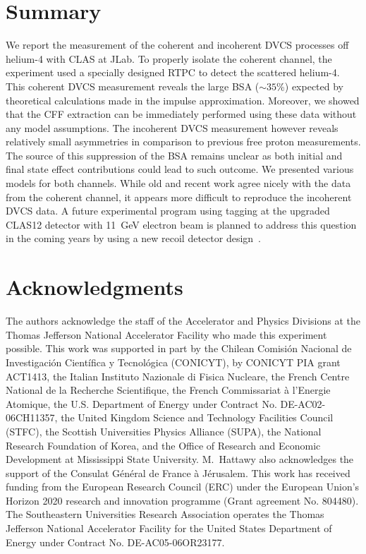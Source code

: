 \documentclass[aps,prc,preprint,superscriptaddress]{revtex4}
\begin{document}
\section{Summary}

We report the measurement of the coherent and incoherent DVCS processes off helium-4 with
CLAS at JLab. To properly isolate the coherent channel, the experiment used a specially 
designed RTPC to detect the scattered helium-4. This coherent 
DVCS measurement reveals the large BSA ($\sim 35$\%) expected by theoretical calculations
made in the impulse approximation. Moreover, we showed that the CFF extraction can be 
immediately performed using these data without any model assumptions. The incoherent DVCS measurement 
however reveals relatively small asymmetries in comparison to previous free proton 
measurements. The source of this suppression of the BSA remains unclear as both 
initial and final state effect contributions could lead to such outcome. We presented 
various models for both channels. While old and recent work agree nicely with the data
from the coherent channel, it appears more difficult to reproduce the incoherent DVCS data.
A future experimental program using tagging at the upgraded CLAS12 detector with 11~GeV
electron beam is 
planned to address this question in the coming years by using a new recoil detector 
design~\cite{Armstrong:2017zcm}.

\section{Acknowledgments}
The authors acknowledge the staff of the Accelerator and Physics Divisions at 
the Thomas Jefferson National Accelerator Facility who made this experiment 
possible. This work was supported in part by the Chilean Comisi\'on Nacional de 
Investigaci\'on Cient\'ifica y Tecnol\'ogica (CONICYT), by CONICYT PIA grant 
ACT1413, the Italian Instituto Nazionale di Fisica Nucleare, the French Centre 
National de la Recherche Scientifique, the French Commissariat \`a l'Energie 
Atomique, the U.S. Department of Energy under Contract No. DE-AC02-06CH11357, 
the United Kingdom Science and Technology Facilities Council (STFC), the 
Scottish Universities Physics Alliance (SUPA), the National Research Foundation 
of Korea, and the Office of Research and Economic Development at Mississippi 
State University. M.~Hattawy also acknowledges the support of the Consulat 
G\'en\'eral de France \`a J\'erusalem. This work has received funding from 
the European Research Council (ERC) under the European Union’s Horizon 2020 
research and innovation programme (Grant agreement No. 804480). The Southeastern Universities Research 
Association operates the Thomas Jefferson National Accelerator Facility for the 
United States Department of Energy under Contract No. DE-AC05-06OR23177.
\end{document}
